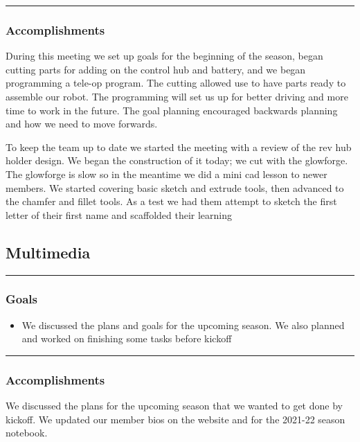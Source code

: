 \noindent\hfil\rule{\textwidth}{.4pt}\hfil

\subsubsection*{Accomplishments}
During this meeting we set up goals for the beginning of the season, began cutting parts for adding on the control hub and battery, and we began programming a tele-op program. The cutting allowed use to have parts ready to assemble our robot. The programming will set us up for better driving and more time to work in the future. The goal planning encouraged backwards planning and how we need to move forwards.

To keep the team up to date we started the meeting with a review of the rev hub holder design. We began the construction of it today; we cut with the glowforge. The glowforge is slow so in the meantime we did a mini cad lesson to newer members. We started covering basic sketch and extrude tools, then advanced to the chamfer and fillet tools. As a test we had them attempt to sketch the first letter of their first name and scaffolded their learning

\subsection*{Multimedia}
\noindent\hfil\rule{\textwidth}{.4pt}\hfil
\subsubsection*{Goals}
\begin{itemize}
    \item We discussed the plans and goals for the upcoming season. We also planned and worked on finishing some tasks before kickoff

\end{itemize} 

\noindent\hfil\rule{\textwidth}{.4pt}\hfil

\subsubsection*{Accomplishments}
We discussed the plans for the upcoming season that we wanted to get done by kickoff. We updated our member bios on the website and for the 2021-22 season notebook. 